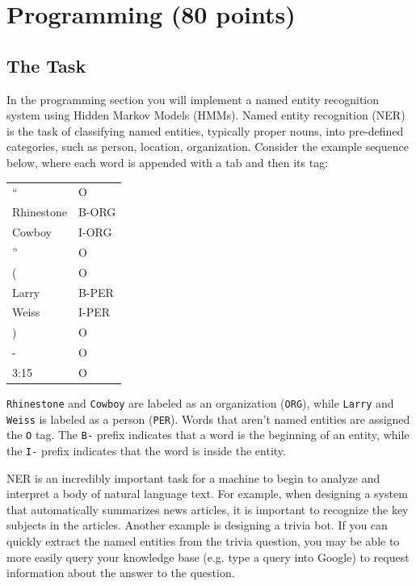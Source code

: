 \documentclass[11pt,addpoints,answers]{exam}
\begin{document}
\clearpage
\section{Programming (80 points)}
\label{programming}

\subsection{The Task}\label{task}
In the programming section you will implement a named entity recognition system using Hidden Markov Models (HMMs). Named entity recognition (NER) is the task of classifying named entities, typically proper nouns,  into pre-defined categories, such as person, location, organization. Consider the example sequence below, where each word is appended with a tab and then its tag:

\begin{tabular}{ m{3cm}  m{3cm} } 
    `` & O \\
    Rhinestone & B-ORG \\
    Cowboy & I-ORG \\
    '' & O \\
    ( & O \\
    Larry & B-PER \\
    Weiss & I-PER \\
    ) & O \\ 
    - & O \\
    3:15 & O
\end{tabular}

 \texttt{Rhinestone} and \texttt{Cowboy} are labeled as an organization (\texttt{ORG}), while \texttt{Larry} and \texttt{Weiss} is labeled as a person (\texttt{PER}). Words that aren't named entities are assigned the \texttt{O} tag. The \texttt{B-} prefix indicates that a word is the beginning of an entity, while the \texttt{I-} prefix indicates that the word is inside the entity.

NER is an incredibly important task for a machine to begin to analyze and interpret a body of natural language text. For example, when designing a system that automatically summarizes news articles, it is important to recognize the key subjects in the articles. Another example is designing a trivia bot. If you can quickly extract the named entities from the trivia question, you may be able to more easily query your knowledge base (e.g. type a query into Google) to request information about the answer to the question.
\end{document}
